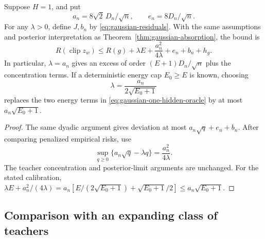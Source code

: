 \begin{theorem}
\label{thm:gaussian-one-hidden}
Suppose $H=1$, and put
\[
 a_n=8\sqrt2\,D_n/\sqrt n,\qquad e_n=8D_n/\sqrt n.
\]
For any $\lambda>0$, define $J,b_n$ by
\eqref{eq:gaussian-residuals}.  With the same assumptions and posterior
interpretation as Theorem~\ref{thm:gaussian-absorption}, the bound is
\begin{equation}
 R(\operatorname{clip}z_w)
 \leq R(g)+\lambda E+\frac{a_n^2}{4\lambda}+e_n+b_n+h_g.
 \label{eq:gaussian-one-hidden-oracle}
\end{equation}
In particular, $\lambda=a_n$ gives an excess of order
$(E+1)D_n/\sqrt n$ plus the concentration terms.  If a deterministic
energy cap $E_0\geq E$ is known, choosing
\begin{equation}
 \lambda=\frac{a_n}{2\sqrt{E_0+1}}
 \label{eq:gaussian-one-hidden-calibration}
\end{equation}
replaces the two energy terms in
\eqref{eq:gaussian-one-hidden-oracle} by at most
$a_n\sqrt{E_0+1}$.
\end{theorem}
\begin{proof}
The same dyadic argument gives deviation at most
$a_n\sqrt q+e_n+b_n$.  After comparing penalized empirical risks, use
\[
 \sup_{q\geq0}\{a_n\sqrt q-\lambda q\}=\frac{a_n^2}{4\lambda}.
\]
The teacher concentration and posterior-limit arguments are unchanged.
For the stated calibration,
$\lambda E+a_n^2/(4\lambda)
=a_n[E/(2\sqrt{E_0+1})+\sqrt{E_0+1}/2]
\leq a_n\sqrt{E_0+1}$.
\end{proof}

\subsection{Comparison with an expanding class of teachers}

